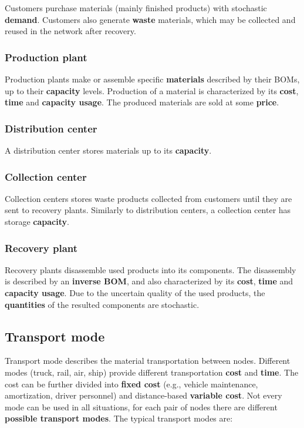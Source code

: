 \documentclass{article}
\begin{document}
Customers purchase materials (mainly finished products) with stochastic \textbf{demand}. Customers also generate \textbf{waste} materials, which may be collected and reused in the network after recovery.

\subsubsection{Production plant}

Production plants make or assemble specific \textbf{materials} described by their BOMs, up to their \textbf{capacity} levels. Production of a material is characterized by its \textbf{cost}, \textbf{time} and \textbf{capacity usage}. The produced materials are sold at some \textbf{price}.

\subsubsection{Distribution center}

A distribution center stores materials up to its \textbf{capacity}.

\subsubsection{Collection center}

Collection centers stores waste products collected from customers until they are sent to recovery plants. Similarly to distribution centers, a collection center has storage \textbf{capacity}.

\subsubsection{Recovery plant}

Recovery plants disassemble used products into its components. The disassembly is described by an \textbf{inverse BOM}, and also characterized by its \textbf{cost}, \textbf{time} and \textbf{capacity usage}. Due to the uncertain quality of the used products, the \textbf{quantities} of the resulted components are stochastic.


\subsection{Transport mode} \label{sec:transport_mode}

Transport mode describes the material transportation between nodes. Different modes (truck, rail, air, ship) provide different transportation \textbf{cost} and \textbf{time}. The cost can be further divided into \textbf{fixed cost} (e.g., vehicle maintenance, amortization, driver personnel) and distance-based \textbf{variable cost}. Not every mode can be used in all situations, for each pair of nodes there are different \textbf{possible transport modes}. The typical transport modes are:
\end{document}
